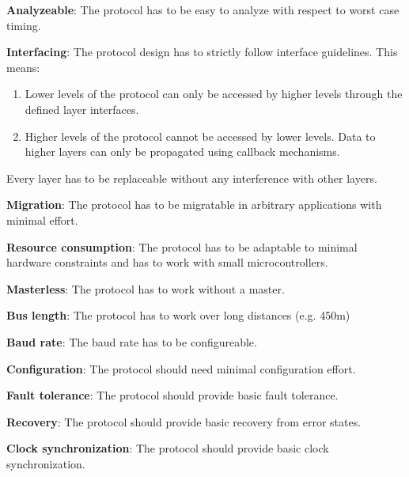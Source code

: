 \begin{req}
\label{req:ulftrtp:analyzeable}
\textbf{Analyzeable}: The protocol has to be easy to analyze with respect to worst case timing.
\end{req}

\begin{req}
\label{req:ulftrtp:interfacing}
\textbf{Interfacing}: The protocol design has to strictly follow interface guidelines. This means:
\begin{enumerate}
 \item Lower levels of the protocol can only be accessed by higher levels through the defined layer interfaces.
 \item Higher levels of the protocol cannot be accessed by lower levels. Data to higher layers can only be propagated 
using callback mechanisms. 
\end{enumerate}
Every layer has to be replaceable without any interference with other layers.
\end{req}

\begin{req}
\label{req:ulftrtp:easy migration}
\textbf{Migration}: The protocol has to be migratable in arbitrary applications with minimal effort.
\end{req}

\begin{req}
\label{req:ulftrtp:resource consumption}
\textbf{Resource consumption}: The protocol has to be adaptable to minimal hardware constraints and has to work 
 with small microcontrollers.
\end{req}

\begin{req}
\label{req:ulftrtp:masterless}
\textbf{Masterless}: The protocol has to work without a master.
\end{req}

\begin{req}
\label{req:ulftrtp:length}
\textbf{Bus length}: The protocol has to work over long distances (e.g. 450m)
\end{req}

\begin{req}
\label{req:ulftrtp:baudrate}
\textbf{Baud rate}: The baud rate has to be configureable.
\end{req}

\begin{req}
\label{req:ulftrtp:configuration}
\textbf{Configuration}: The protocol should need minimal configuration effort.
\end{req}

\begin{req}
\label{req:ulftrtp:ft}
\textbf{Fault tolerance}: The protocol should provide basic fault tolerance.
\end{req}

\begin{req}
\label{req:ulftrtp:recovery}
\textbf{Recovery}: The protocol should provide basic recovery from error states.
\end{req}

\begin{req}
\label{req:ulftrtp:clocksync}
\textbf{Clock synchronization}: The protocol should provide basic clock synchronization.
\end{req}

